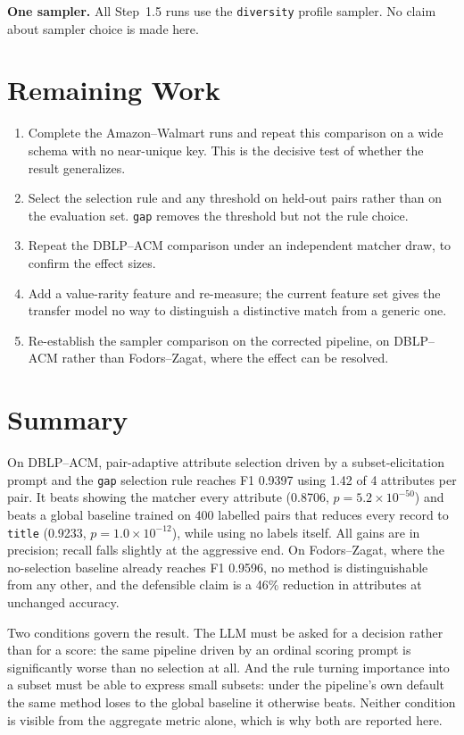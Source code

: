 \documentclass[11pt]{article}
\begin{document}
\textbf{One sampler.} All Step~1.5 runs use the \texttt{diversity} profile sampler. No claim
about sampler choice is made here.

\section{Remaining Work}

\begin{enumerate}
\item Complete the Amazon--Walmart runs and repeat this comparison on a wide schema with no
      near-unique key. This is the decisive test of whether the result generalizes.
\item Select the selection rule and any threshold on held-out pairs rather than on the
      evaluation set. \texttt{gap} removes the threshold but not the rule choice.
\item Repeat the DBLP--ACM comparison under an independent matcher draw, to confirm the
      effect sizes.
\item Add a value-rarity feature and re-measure; the current feature set gives the transfer
      model no way to distinguish a distinctive match from a generic one.
\item Re-establish the sampler comparison on the corrected pipeline, on DBLP--ACM rather than
      Fodors--Zagat, where the effect can be resolved.
\end{enumerate}

\section{Summary}

On DBLP--ACM, pair-adaptive attribute selection driven by a subset-elicitation prompt and the
\texttt{gap} selection rule reaches F1 0.9397 using 1.42 of 4 attributes per pair. It beats
showing the matcher every attribute (0.8706, $p = 5.2\times10^{-50}$) and beats a global
baseline trained on 400 labelled pairs that reduces every record to \texttt{title} (0.9233,
$p = 1.0\times10^{-12}$), while using no labels itself. All gains are in precision; recall
falls slightly at the aggressive end. On Fodors--Zagat, where the no-selection baseline
already reaches F1 0.9596, no method is distinguishable from any other, and the defensible
claim is a 46\% reduction in attributes at unchanged accuracy.

Two conditions govern the result. The LLM must be asked for a decision rather than for a
score: the same pipeline driven by an ordinal scoring prompt is significantly worse than no
selection at all. And the rule turning importance into a subset must be able to express small
subsets: under the pipeline's own default the same method loses to the global baseline it
otherwise beats. Neither condition is visible from the aggregate metric alone, which is why
both are reported here.
\end{document}
